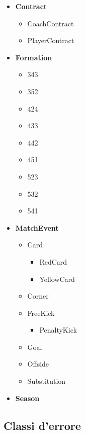 \documentclass[11pt]{report} %
\begin{document}
\begin{itemize}[leftmargin=*]
  \item \textbf{Contract}
  \begin{itemize}[leftmargin=2em]
    \item CoachContract
    \item PlayerContract
  \end{itemize}

  \item \textbf{Formation}
  \begin{itemize}[leftmargin=2em]
    \item 343
    \item 352
    \item 424
    \item 433
    \item 442
    \item 451
    \item 523
    \item 532
    \item 541
  \end{itemize}

  \item \textbf{MatchEvent}
  \begin{itemize}[leftmargin=2em]
    \item Card
    \begin{itemize}[leftmargin=2em]
      \item RedCard
      \item YellowCard
    \end{itemize}

    \item Corner

    \item FreeKick
    \begin{itemize}[leftmargin=2em]
      \item PenaltyKick
    \end{itemize}

    \item Goal
    \item Offside
    \item Substitution
  \end{itemize}

  \item \textbf{Season}
\end{itemize}




 \subsection{Classi d'errore}
\end{document}
